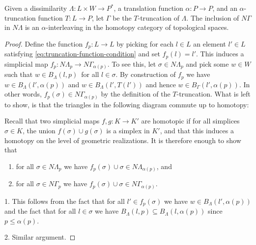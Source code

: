 \begin{prop}
	Given  a dissimilarity $\Lambda\colon L\times W\to P^*$, a translation function $\alpha\colon P\to P$, and an $\alpha$-truncation function $T\colon L\to P$, let $\Gamma$ be the $T$-truncation of $\Lambda$. The inclusion of $N\Gamma$ in $N\Lambda$ is an $\alpha$-interleaving in the homotopy category of topological spaces.
\end{prop}

\begin{proof}
	Define the function $f_p\colon L\to L$ by picking for each $l\in L$ an element $l'\in L$ satisfying \cref{eq:truncation-function-condition} and set $f_p(l)=l'$. This induces a simplicial map $f_p\colon N\Lambda_p\to N\Gamma_{\alpha(p)}$. To see this, let $\sigma\in N\Lambda_p$ and pick some $w\in W$ such that $w\in B_\Lambda(l,p)$ for all $l\in\sigma$. By construction of $f_p$ we have $w\in B_\Lambda(l',\alpha(p))$ and $w\in B_\Lambda(l',T(l'))$ and hence $w\in B_\Gamma(l',\alpha(p))$. In other words, $f_p(\sigma)\in N\Gamma_{\alpha(p)}$ by the definition of the $T$-truncation. What is left to show, is that the triangles in the following diagram commute up to homotopy:
	\begin{center}
	\end{center}
	Recall that two simplicial maps $f,g\colon K\to K'$ are homotopic if for all simplices $\sigma\in K$, the union $f(\sigma)\cup g(\sigma)$ is a simplex in $K'$, and that this induces a homotopy on the level of geometric realizations. It is therefore enough to show that
	\begin{enumerate}
		\item for all $\sigma\in N\Lambda_p$ we have $f_p(\sigma)\cup\sigma\in N\Lambda_{\alpha(p)}$, and
		\item for all $\sigma\in N\Gamma_p$ we have $f_p(\sigma)\cup\sigma\in N\Gamma_{\alpha(p)}$.
	\end{enumerate}
	1. This follows from the fact that for all $l'\in f_p(\sigma)$ we have $w\in B_\Lambda(l',\alpha(p))$ and the fact that for all $l\in\sigma$ we have $B_\Lambda(l,p)\subseteq B_\Lambda(l,\alpha(p))$ since $p\leq\alpha(p)$.
	
	2. Similar argument.
\end{proof}




\printbibliography
